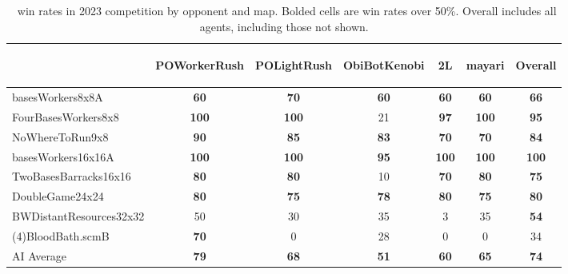 \documentclass{article}
\begin{document}
\begin{table}[ht]
    \caption{\agentName\ win rates in 2023 competition by opponent and map. Bolded cells are win rates over 50\%. Overall includes all agents, including those not shown.}
    \label{tab:competition-winrate-by-map}
    \begin{center}
    \begin{tabular}{lccccc|c}
    \toprule
    & \begin{sideways}POWorkerRush\end{sideways} & \begin{sideways}POLightRush\end{sideways} & \begin{sideways}ObiBotKenobi\end{sideways} & \begin{sideways}2L\end{sideways} & \begin{sideways}mayari\end{sideways} & \begin{sideways}Overall\end{sideways}\\ 
    \midrule
    basesWorkers8x8A & \textbf{60} & \textbf{70} & \textbf{60} & \textbf{60} & \textbf{60} & \textbf{66}\\ 
    FourBasesWorkers8x8 & \textbf{100} & \textbf{100} & 21 & \textbf{97} & \textbf{100} & \textbf{95}\\ 
    NoWhereToRun9x8 & \textbf{90} & \textbf{85} & \textbf{83} & \textbf{70} & \textbf{70} & \textbf{84}\\
    basesWorkers16x16A & \textbf{100} & \textbf{100} & \textbf{95} & \textbf{100} & \textbf{100} & \textbf{100}\\
    TwoBasesBarracks16x16 & \textbf{80} & \textbf{80} & 10 & \textbf{70} & \textbf{80} & \textbf{75}\\
    DoubleGame24x24 & \textbf{80} & \textbf{75} & \textbf{78} & \textbf{80} & \textbf{75} & \textbf{80}\\ 
    BWDistantResources32x32 & 50 & 30 & 35 & 3 & 35 & \textbf{54}\\
    (4)BloodBath.scmB & \textbf{70} & 0 & 28 & 0 & 0 & 34\\ 
    \hline
    AI Average & \textbf{79} & \textbf{68} & \textbf{51} & \textbf{60} & \textbf{65} & \textbf{74}\\ 
    \end{tabular}
    \end{center}
\end{table}
\end{document}
